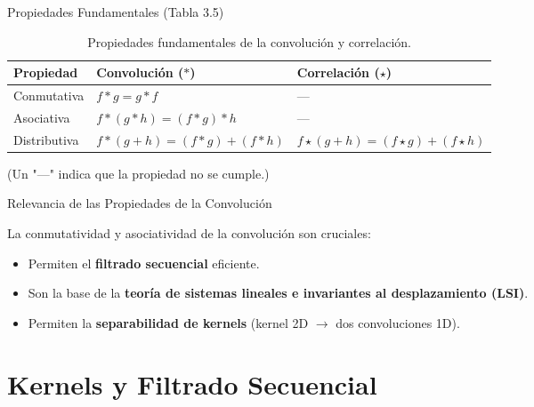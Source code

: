 \documentclass[10pt]{beamer}
\begin{document}
\begin{frame}{Propiedades Fundamentales (Tabla 3.5)}
\begin{table}
\centering
\caption{\footnotesize Propiedades fundamentales de la convolución y correlación.}
\begin{tabular}{l|>{\centering\arraybackslash}p{3cm}|>{\centering\arraybackslash}p{3cm}}
\hline
\textbf{\scriptsize Propiedad} & \textbf{\scriptsize Convolución ($*$)} & \textbf{\scriptsize Correlación ($\star$)} \\
\hline \hline
\scriptsize Conmutativa & \scriptsize $f*g = g*f$ & \scriptsize --- \\
\scriptsize Asociativa & \scriptsize $f*(g*h) = (f*g)*h$ & \scriptsize --- \\
\scriptsize Distributiva & \scriptsize $f*(g+h) = (f*g) + (f*h)$ & \scriptsize $f \star (g+h) = (f \star g) + (f \star h)$ \\
\hline
\end{tabular}
\vspace{0.1cm}
\tiny (Un "---" indica que la propiedad no se cumple.)
\end{table}
\vspace{0.1cm}
\begin{alertblock}{\footnotesize Relevancia de las Propiedades de la Convolución}
{\footnotesize La conmutatividad y asociatividad de la convolución son cruciales:
\begin{itemize}
\item Permiten el \textbf{filtrado secuencial} eficiente.
\item Son la base de la \textbf{teoría de sistemas lineales e invariantes al desplazamiento (LSI)}.
\item Permiten la \textbf{separabilidad de kernels} (kernel 2D $\rightarrow$ dos convoluciones 1D).
\end{itemize}
}
\end{alertblock}
\end{frame}

\section{Kernels y Filtrado Secuencial}
\end{document}
